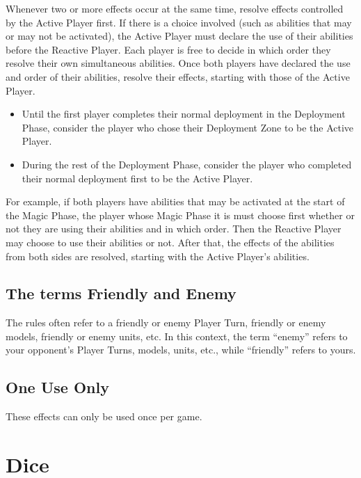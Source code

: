 Whenever two or more effects occur at the same time, resolve effects controlled by the Active Player first. If there is a choice involved (such as abilities that may or may not be activated), the Active Player must declare the use of their abilities before the Reactive Player. Each player is free to decide in which order they resolve their own simultaneous abilities. Once both players have declared the use and order of their abilities, resolve their effects, starting with those of the Active Player.

\begin{itemize}
\item Until the first player completes their normal deployment in the Deployment Phase, consider the player who chose their Deployment Zone to be the Active Player.
\item During the rest of the Deployment Phase, consider the player who completed their normal deployment first to be the Active Player.
\end{itemize}

\columnbreak

For example, if both players have abilities that may be activated at the start of the Magic Phase, the player whose Magic Phase it is must choose first whether or not they are using their abilities and in which order. Then the Reactive Player may choose to use their abilities or not. After that, the effects of the abilities from both sides are resolved, starting with the Active Player's abilities.

\subsection{The terms Friendly and Enemy}

The rules often refer to a friendly or enemy Player Turn, friendly or enemy models, friendly or enemy units, etc. In this context, the term \enquote{enemy} refers to your opponent's Player Turns, models, units, etc., while \enquote{friendly} refers to yours.

\subsection{One Use Only}
\label{one_use_only}

These effects can only be used once per game.

\section{Dice}
\label{dice}

